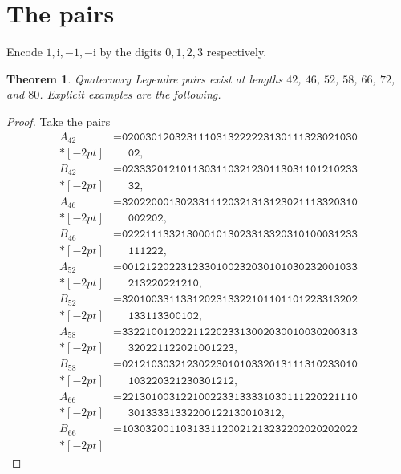 \documentclass[11pt]{article}
\newtheorem{theorem}{Theorem}
\newcommand{\ii}{\mathrm{i}}
\begin{document}
\section{The pairs}
\label{sec:pairs}

Encode $1,\ii,-1,-\ii$ by the digits $0,1,2,3$ respectively.

\begin{theorem}
\label{thm:pairs}
Quaternary Legendre pairs exist at lengths $42$, $46$, $52$, $58$, $66$,
$72$, and $80$.  Explicit examples are the following.
\end{theorem}

\begin{proof}
Take the pairs
\begin{align*}
A_{42}&=\texttt{0200301203231110313222223130111323021030}\\*[-2pt]
      &\phantom{{}={}}\texttt{02},\\
B_{42}&=\texttt{0233320121011303110321230113031101210233}\\*[-2pt]
      &\phantom{{}={}}\texttt{32},\\
A_{46}&=\texttt{3202200013023311120321313123021113320310}\\*[-2pt]
      &\phantom{{}={}}\texttt{002202},\\
B_{46}&=\texttt{0222111332130001013023313320310100031233}\\*[-2pt]
      &\phantom{{}={}}\texttt{111222},\\
A_{52}&=\texttt{0012122022312330100232030101030232001033}\\*[-2pt]
      &\phantom{{}={}}\texttt{213220221210},\\
B_{52}&=\texttt{3201003311331202313322101101101223313202}\\*[-2pt]
      &\phantom{{}={}}\texttt{133113300102},\\
A_{58}&=\texttt{3322100120221122023313002030010030200313}\\*[-2pt]
      &\phantom{{}={}}\texttt{320221122021001223},\\
B_{58}&=\texttt{0212103032123022301010332013111310233010}\\*[-2pt]
      &\phantom{{}={}}\texttt{103220321230301212},\\
A_{66}&=\texttt{2213010031221002233133331030111220221110}\\*[-2pt]
      &\phantom{{}={}}\texttt{30133331332200122130010312},\\
B_{66}&=\texttt{1030320011031331120021213232202020202022}\\*[-2pt]

\end{align*}
\end{proof}
\end{document}
